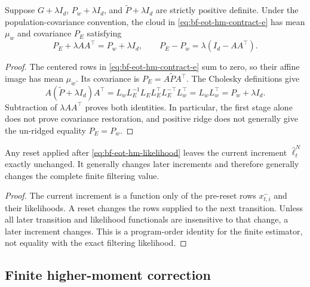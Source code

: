 \begin{proposition}
\label{prop:bf-eot-hm-contract-e}
Suppose \(G+\lambda I_d\), \(P_w+\lambda I_d\), and
\(\widetilde P+\lambda I_d\) are strictly positive definite.  Under the
population-covariance convention, the cloud in
\eqref{eq:bf-eot-hm-contract-e} has mean \(\mu_w\) and covariance \(P_E\)
satisfying
\begin{equation}
 P_E+\lambda AA^\top=P_w+\lambda I_d,
 \qquad
 P_E-P_w=\lambda(I_d-AA^\top).
 \label{eq:bf-eot-hm-ridged-identity}
\end{equation}
\end{proposition}

\begin{proof}
The centered rows in \eqref{eq:bf-eot-hm-contract-e} sum to zero, so their
affine image has mean \(\mu_w\).  Its covariance is
\(P_E=A\widetilde P A^\top\).  The Cholesky definitions give
\[
 A(\widetilde P+\lambda I_d)A^\top
 =L_wL_E^{-1}L_EL_E^\top L_E^{-\top}L_w^\top
 =L_wL_w^\top=P_w+\lambda I_d.
\]
Subtraction of \(\lambda AA^\top\) proves both identities.  In particular,
the first stage alone does not prove covariance restoration, and positive
ridge does not generally give the un-ridged equality \(P_E=P_w\).
\end{proof}

\begin{proposition}
\label{prop:bf-eot-hm-current-value}
Any reset applied after \eqref{eq:bf-eot-hm-likelihood} leaves the current
increment \(\widehat\ell_t^N\) exactly unchanged.  It generally changes later
increments and therefore generally changes the complete finite filtering
value.
\end{proposition}

\begin{proof}
The current increment is a function only of the pre-reset rows
\(x_{t,i}^{-}\) and their likelihoods.  A reset changes the rows supplied to
the next transition.  Unless all later transition and likelihood functionals
are insensitive to that change, a later increment changes.  This is a
program-order identity for the finite estimator, not equality with the exact
filtering likelihood.
\end{proof}

\subsection{Finite higher-moment correction}

